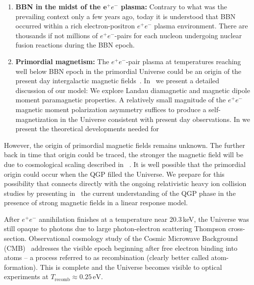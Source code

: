 \begin{enumerate}
%
\item \textbf{BBN in the midst of the ${\mathbf e^+e^-}$ plasma:} Contrary to what was the prevailing context only a few years ago, today it is understood that BBN occurred within a rich electron-positron $e^+e^-$ plasma environment. There are thousands if not millions of ${ e^+e^-}$-pairs for each nucleon undergoing nuclear fusion reactions during the BBN epoch. 
%
\item \textbf{Primordial magnetism:} The $e^{+}e^{-}$-pair plasma at temperatures reaching well below BBN epoch in the primordial Universe could be an origin of the present day intergalactic magnetic fields~\cite{Rafelski:2023emw,Steinmetz:2023nsc}. In~ we present a detailed discussion of our model: We explore Landau diamagnetic and magnetic dipole moment paramagnetic properties. A relatively small magnitude of the $e^{+}e^{-}$ magnetic moment polarization asymmetry suffices to produce a self-magnetization in the Universe consistent with present day observations. In  we present the theoretical developments needed for 
\end{enumerate}

{\color{black} However, the origin of primordial magnetic fields remains unknown. The further back in time that origin could be traced, the stronger the magnetic field will be due to cosmological scaling described in~ . It is well possible that the primordial origin could occur when the QGP filled the Universe. We prepare for this possibility that connects directly with the ongoing relativistic heavy ion collision studies by presenting in~ the current understanding of the QGP phase in the presence of strong magnetic fields in a linear response model.}

After $e^+e^-$ annihilation finishes at a temperature near 20.3\,keV, the Universe was still opaque to photons due to large photon-electron scattering Thompson cross-section. Observational cosmology study of the Cosmic Microwave Background (CMB)~\cite{Planck:2018vyg} addresses the visible epoch beginning after free electron binding into atoms -- a process referred to as recombination (clearly better called atom-formation). This is complete and the Universe becomes visible to optical experiments at $T_\mathrm{recomb}\approx 0.25\,\mathrm{eV}$. 

